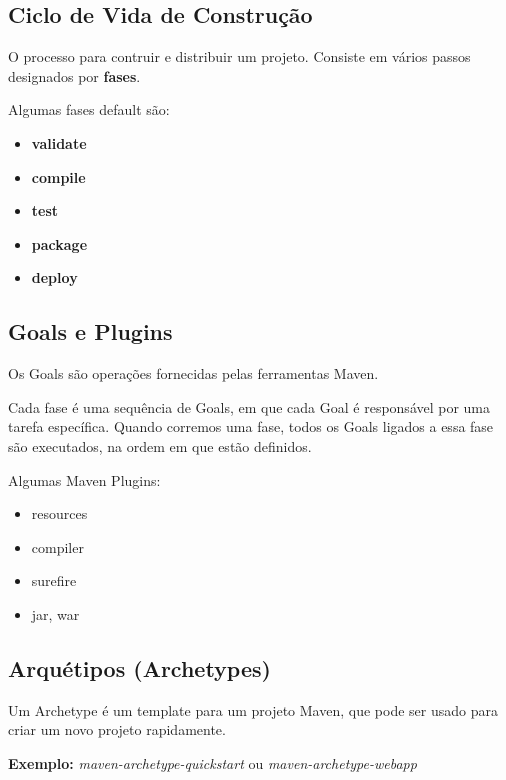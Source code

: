 \documentclass{article}
\begin{document}
\subsection{Ciclo de Vida de Construção}

O processo para contruir e distribuir um projeto. Consiste
em vários passos designados por \textbf{fases}.

Algumas fases default são:
\begin{itemize}
  \item \textbf{validate}
  \item \textbf{compile}
  \item \textbf{test}
  \item \textbf{package}
  \item \textbf{deploy}
\end{itemize}

\pagebreak

\subsection{Goals e Plugins}

Os Goals são operações fornecidas pelas ferramentas Maven.

Cada fase é uma sequência de Goals, em que cada Goal é responsável
por uma tarefa específica. Quando corremos uma fase, todos os Goals
ligados a essa fase são executados, na ordem em que estão definidos.

\begin{flushleft}
  Algumas Maven Plugins:
  \begin{itemize}
    \item resources
    \item compiler
    \item surefire
    \item jar, war
  \end{itemize}
\end{flushleft}

\subsection{Arquétipos (Archetypes)}

Um Archetype é um template para um projeto Maven, que pode ser usado para
criar um novo projeto rapidamente.

\begin{flushleft}
  \textbf{Exemplo:} \textit{maven-archetype-quickstart} ou \textit{maven-archetype-webapp}
\end{flushleft}
\end{document}
